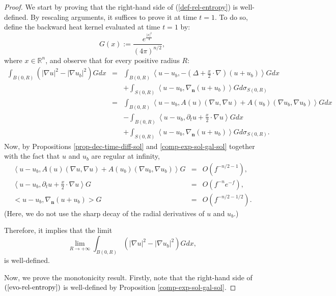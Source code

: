 \documentclass[a4paper,11pt,reqno]{amsart}
\begin{document}
\begin{proof}
We start by proving that the right-hand side of (\ref{def-rel-entropy}) is well-defined. By rescaling arguments, it suffices to prove it at time $t=1$.
To do so, define the backward heat kernel evaluated at time $t=1$ by:
$$G(x):=\frac{e^{\frac{|x|^2}{4}}}{(4\pi )^{n/2}},$$
where $x\in\mathbb{R}^n$, and
observe that for every positive radius $R$:
\begin{eqnarray*}
\int_{B(0,R)}\left(|\nabla u|^2-|\nabla u_b|^2 \right)Gdx&=&\int_{B(0,R)}\left<u-u_b,-\left(\Delta+\frac{x}{2}\cdot\nabla\right)(u+u_b)\right>Gdx\\
&&+\int_{S(0,R)}\left<u-u_b,\nabla_{\mathbf{n}}(u+u_b)\right>Gd\sigma_{S(0,R)}\\
&=&\int_{B(0,R)}\left<u-u_b,A(u)(\nabla u,\nabla u)+A(u_b)(\nabla u_b,\nabla u_b)\right>Gdx\\
&&-\int_{B(0,R)}\left<u-u_b,\partial_tu+\frac{x}{2}\cdot\nabla u\right>Gdx\\
&&+\int_{S(0,R)}\left<u-u_b,\nabla_{\mathbf{n}}(u+u_b)\right>Gd\sigma_{S(0,R)}.
\end{eqnarray*}
Now, by Propositions \ref{prop-dec-time-diff-sol} and \ref{comp-exp-sol-gal-sol} together with the fact that $u$ and $u_b$ are regular at infinity,  
\begin{eqnarray*}
\left<u-u_b,A(u)(\nabla u,\nabla u)+A(u_b)(\nabla u_b,\nabla u_b)\right>G&=&\textit{O}(f^{-n/2-1}),\\
\left<u-u_b,\partial_tu+\frac{x}{2}\cdot\nabla u\right>G&=&\textit{O}(f^{-n}e^{-f}),\\
<u-u_b,\nabla_{\mathbf{n}}(u+u_b)>G&=&\textit{O}(f^{-n/2-1/2}).
\end{eqnarray*}
(Here, we do not use the sharp decay of the radial derivatives of $u$ and $u_b$.)

Therefore, it implies that the limit $$\lim_{R\rightarrow+\infty}\int_{B(0,R)}\left(|\nabla u|^2-|\nabla u_b|^2 \right)Gdx,$$ is well-defined.

Now, we prove the monotonicity result.
Firstly, note that the right-hand side of $(\ref{evo-rel-entropy})$ is well-defined by Proposition \ref{comp-exp-sol-gal-sol}.


\end{proof}
\end{document}
